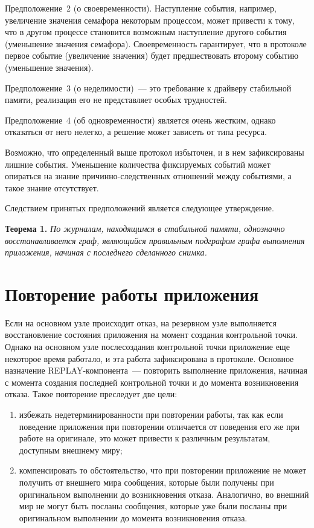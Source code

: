 \begin{multicols}{2}
Предположение~2 (о своевременности). Наступление события,  например,
увеличение значения семафора некоторым процессом, может привести к тому,
что в другом процессе становится возможным наступление другого события
(уменьшение значения семафора). Своевременность гарантирует, что в
протоколе первое событие (увеличение значения) будет пред\-шес\-т\-во\-вать
второму событию (уменьшение значения).

Предположение~3 (о неделимости)~--- это требование к драйверу стабильной
памяти, реализация его не представляет особых трудностей.

Предположение~4 (об одновременности) явля\-ет\-ся очень жестким, однако
отказаться от него нелегко, а решение может зависеть от типа ресурса.

Возможно, что определенный выше протокол избыточен,  и в нем
зафиксированы лишние события. Уменьшение количества фиксируемых
событий  может опираться на знание причинно-следственных отношений
между событиями, а такое знание отсутствует.

Следствием принятых предположений является следующее утверждение.

\textbf{Теорема 1.} \textit{По журналам, находящимся в стабильной памяти,
однозначно вос\-ста\-нав\-ли\-ва\-ет\-ся граф, являющийся правильным подграфом
графа выполнения приложения, начиная с последнего сделанного снимка. }

\section{Повторение работы приложения}

Если на основном узле происходит отказ, на резервном узле выполняется
восстановление состояния приложения на момент создания контрольной точки.
Однако на основном узле после\linebreak со\-зда\-ния контрольной точки приложение еще
некоторое время работало, и эта работа зафиксирована в протоколе. Основное
назначение REPLAY-компонента~--- повторить выполнение приложения,
начиная с момента создания последней контрольной точки и до момента
возникновения отказа. Такое повторение преследует две цели:
\begin{enumerate}[(1)]
\item избежать недетерминированности при повторении работы, так как если поведение
приложения при повторении  отличается от поведения его же при работе на оригинале,
это может привести к различным результатам, доступ\-ным внешнему миру;
\item компенсировать то обстоятельство, что при повторении приложение не
может получить от внешнего мира сообщения,
 которые были получены при
оригинальном выполнении до возникновения отказа. Аналогично, во внешний
мир не могут быть посланы сообщения, которые уже были посланы при
оригинальном выполнении до момента возникновения отказа.
\end{enumerate}


\end{multicols}
